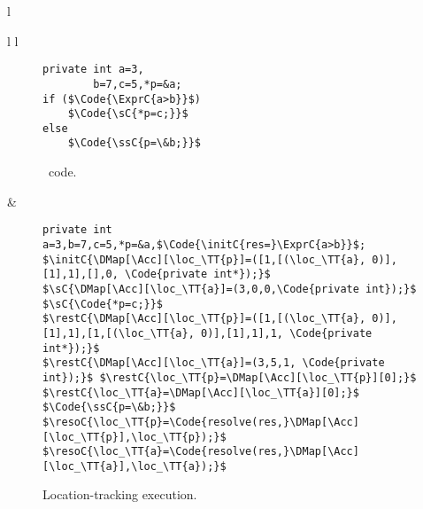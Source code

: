 


\begin{figure*} \footnotesize
\begin{tabular}{l}
\begin{tabular}{l l}
\hspace{0.3cm}
\begin{subfigure}{.27\textwidth}
\begin{lstlisting}
private int a=3,
		b=7,c=5,*p=&a;
if ($\Code{\ExprC{a>b}}$)
	$\Code{\sC{*p=c;}}$ 
else 
	$\Code{\ssC{p=\&b;}}$
\end{lstlisting}
	\caption{\piccoC\ code.}
	\label{Fig: if else \piccoC code dp}	
\end{subfigure}		
&
\begin{subfigure}{0.69\textwidth}
\begin{lstlisting}[emph={[2]res, resolve}, emphstyle={[2]\color{blue}}]
private int a=3,b=7,c=5,*p=&a,$\Code{\initC{res=}\ExprC{a>b}}$;
$\initC{\DMap[\Acc][\loc_\TT{p}]=([1,[(\loc_\TT{a}, 0)],[1],1],[],0, \Code{private int*});}$  
$\sC{\DMap[\Acc][\loc_\TT{a}]=(3,0,0,\Code{private int});}$   $\sC{\Code{*p=c;}}$ 
$\restC{\DMap[\Acc][\loc_\TT{p}]=([1,[(\loc_\TT{a}, 0)],[1],1],[1,[(\loc_\TT{a}, 0)],[1],1],1, \Code{private int*});}$
$\restC{\DMap[\Acc][\loc_\TT{a}]=(3,5,1, \Code{private int});}$ $\restC{\loc_\TT{p}=\DMap[\Acc][\loc_\TT{p}][0];}$  $\restC{\loc_\TT{a}=\DMap[\Acc][\loc_\TT{a}][0];}$
$\Code{\ssC{p=\&b;}}$
$\resoC{\loc_\TT{p}=\Code{resolve(res,}\DMap[\Acc][\loc_\TT{p}],\loc_\TT{p});}$   $\resoC{\loc_\TT{a}=\Code{resolve(res,}\DMap[\Acc][\loc_\TT{a}],\loc_\TT{a});}$
\end{lstlisting}
	\caption{Location-tracking execution.}	
	\label{Fig: if else piccoC expanded dp}
\end{subfigure} 
\end{tabular}
\\ \\
\begin{subfigure}{\textwidth}
\end{subfigure}
\end{tabular}
\end{figure*}
